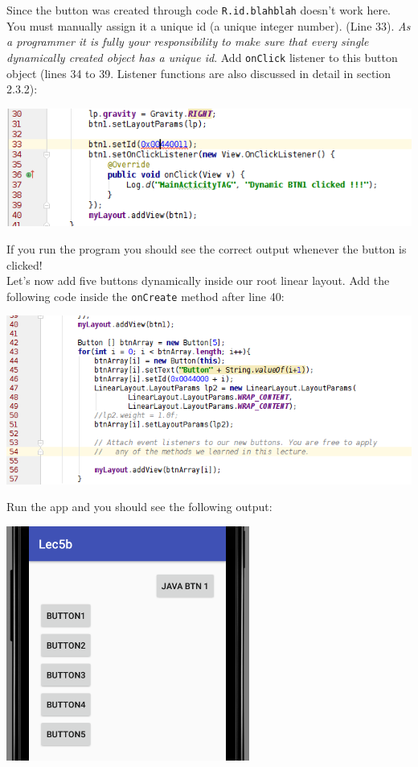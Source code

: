 \vskip 3mm
Since the button was created through code \texttt{R.id.blahblah} doesn't work here. You must manually assign it a unique id (a unique integer number). (Line 33). \textit{As a programmer it is fully your responsibility to make sure that every single dynamically created object has a unique id}. Add \texttt{onClick} listener to this button object (lines 34 to 39. Listener functions are also discussed in detail in section 2.3.2):

\begin{center}
	\includegraphics[scale=0.4]{chapters/ch05/images/26}
\end{center}

If you run the program you should see the correct output whenever the button is clicked! \\

Let's now add five buttons dynamically inside our root linear layout. Add the following code inside the \texttt{onCreate} method after line 40:

\begin{center}
	\includegraphics[scale=0.4]{chapters/ch05/images/27}
\end{center}

Run the app and you should see the following output:

\begin{center}
	\includegraphics[scale=0.4]{chapters/ch05/images/28}
\end{center}

